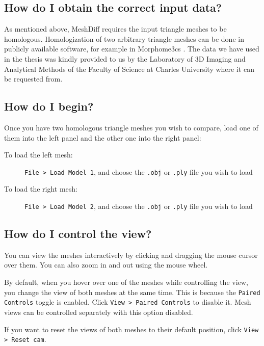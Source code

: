 
\subsection{How do I obtain the correct input data?}

As mentioned above, MeshDiff requires the input triangle meshes to be homologous. Homologization of two arbitrary triangle meshes can be done in publicly available software, for example in Morphome3cs \citep{Morpho}. The data we have used in the thesis was kindly provided to us by the Laboratory of 3D Imaging and Analytical Methods of the Faculty of Science at Charles University where it can be requested from.

\subsection{How do I begin?}

Once you have two homologous triangle meshes you wish to compare, load one of them into the left panel and the other one into the right panel:

\begin{description}
\item [To load the left mesh:] \verb+File > Load Model 1+, and choose the \verb+.obj+ or \verb+.ply+ file you wish to load
\item [To load the right mesh:] \verb+File > Load Model 2+, and choose the \verb+.obj+ or \verb+.ply+ file you wish to load
\end{description}

\subsection{How do I control the view?}
\label{sec:view_control}

You can view the meshes interactively by clicking and dragging the mouse cursor over them. You can also zoom in and out using the mouse wheel.

By default, when you hover over one of the meshes while controlling the view, you change the view of both meshes at the same time. This is because the \verb+Paired Controls+ toggle is enabled. Click \verb+View > Paired Controls+ to disable it. Mesh views can be controlled separately with this option disabled.

If you want to reset the views of both meshes to their default position, click \verb+View > Reset cam+.

